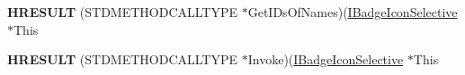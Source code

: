 \begin{DoxyCompactItemize}
\item 
\hypertarget{struct_i_badge_icon_selective_vtbl_adba609964918ef4d40f34fab2b9c8ef2}{{\bfseries H\-R\-E\-S\-U\-L\-T} (S\-T\-D\-M\-E\-T\-H\-O\-D\-C\-A\-L\-L\-T\-Y\-P\-E $\ast$Get\-I\-Ds\-Of\-Names)(\hyperlink{interface_i_badge_icon_selective}{I\-Badge\-Icon\-Selective} $\ast$This}\label{struct_i_badge_icon_selective_vtbl_adba609964918ef4d40f34fab2b9c8ef2}

\item 
\hypertarget{struct_i_badge_icon_selective_vtbl_ab4d894896a80d6f49504174fb7430181}{{\bfseries H\-R\-E\-S\-U\-L\-T} (S\-T\-D\-M\-E\-T\-H\-O\-D\-C\-A\-L\-L\-T\-Y\-P\-E $\ast$Invoke)(\hyperlink{interface_i_badge_icon_selective}{I\-Badge\-Icon\-Selective} $\ast$This}\label{struct_i_badge_icon_selective_vtbl_ab4d894896a80d6f49504174fb7430181}

\end{DoxyCompactItemize}
